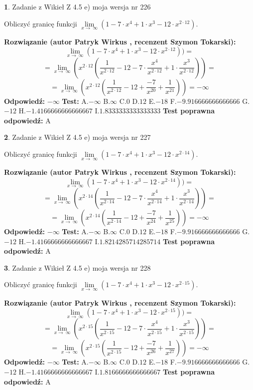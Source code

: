 \documentclass[12pt, a4paper]{article}
\theoremstyle{definition} %
\newtheorem{zad}{}
\newcommand{\zadStart}[1]{\begin{zad}#1\newline}
\newcommand{\zadStop}{\end{zad}}
\newcommand{\rozwStart}[2]{\noindent \textbf{Rozwiązanie (autor #1 , recenzent #2): }\newline}
\newcommand{\rozwStop}{\newline}
\newcommand{\odpStart}{\noindent \textbf{Odpowiedź:}\newline}
\newcommand{\odpStop}{\newline}
\newcommand{\testStart}{\noindent \textbf{Test:}\newline}
\newcommand{\testStop}{\newline}
\newcommand{\kluczStart}{\noindent \textbf{Test poprawna odpowiedź:}\newline}
\newcommand{\kluczStop}{\newline}
\begin{document}
\zadStart{Zadanie z Wikieł Z 4.5 e) moja wersja nr 226}


Obliczyć granicę funkcji  $\lim\limits_{x\to\ \infty}(1 - 7 \cdot x^{4}+1 \cdot x^{3}- 12 \cdot x^{2\cdot12})$.
\zadStop
\rozwStart{Patryk Wirkus}{Szymon Tokarski}
$$\lim\limits_{x\to\ \infty}(1 - 7 \cdot x^{4}+1 \cdot x^{3}- 12 \cdot x^{2\cdot12}))=$$
$$=\lim\limits_{x\to\ \infty}(x^{2\cdot12}(\frac{1}{x^{2\cdot12}}-12 -7 \cdot \frac{x^{4}}{x^{2\cdot12}}+1 \cdot \frac{x^{3}}{x^{2\cdot12}}))=$$
$$=\lim\limits_{x\to\ \infty}(x^{2\cdot12}(\frac{1}{x^{2\cdot12}}-12 + \frac{-7}{x^{20}}+ \frac{1}{x^{21}}))=-\infty$$
\rozwStop
\odpStart
$-\infty$
\odpStop
\testStart
A.$-\infty$ B.$\infty$ C.$0$ D.$12$ E.$-18$
F.$-9.916666666666666$ G.$-12$
H.$-1.4166666666666667$
I.$1.8333333333333333$
\testStop
\kluczStart
A
\kluczStop



\zadStart{Zadanie z Wikieł Z 4.5 e) moja wersja nr 227}


Obliczyć granicę funkcji  $\lim\limits_{x\to\ \infty}(1 - 7 \cdot x^{4}+1 \cdot x^{3}- 12 \cdot x^{2\cdot14})$.
\zadStop
\rozwStart{Patryk Wirkus}{Szymon Tokarski}
$$\lim\limits_{x\to\ \infty}(1 - 7 \cdot x^{4}+1 \cdot x^{3}- 12 \cdot x^{2\cdot14}))=$$
$$=\lim\limits_{x\to\ \infty}(x^{2\cdot14}(\frac{1}{x^{2\cdot14}}-12 -7 \cdot \frac{x^{4}}{x^{2\cdot14}}+1 \cdot \frac{x^{3}}{x^{2\cdot14}}))=$$
$$=\lim\limits_{x\to\ \infty}(x^{2\cdot14}(\frac{1}{x^{2\cdot14}}-12 + \frac{-7}{x^{24}}+ \frac{1}{x^{25}}))=-\infty$$
\rozwStop
\odpStart
$-\infty$
\odpStop
\testStart
A.$-\infty$ B.$\infty$ C.$0$ D.$12$ E.$-18$
F.$-9.916666666666666$ G.$-12$
H.$-1.4166666666666667$
I.$1.8214285714285714$
\testStop
\kluczStart
A
\kluczStop



\zadStart{Zadanie z Wikieł Z 4.5 e) moja wersja nr 228}


Obliczyć granicę funkcji  $\lim\limits_{x\to\ \infty}(1 - 7 \cdot x^{4}+1 \cdot x^{3}- 12 \cdot x^{2\cdot15})$.
\zadStop
\rozwStart{Patryk Wirkus}{Szymon Tokarski}
$$\lim\limits_{x\to\ \infty}(1 - 7 \cdot x^{4}+1 \cdot x^{3}- 12 \cdot x^{2\cdot15}))=$$
$$=\lim\limits_{x\to\ \infty}(x^{2\cdot15}(\frac{1}{x^{2\cdot15}}-12 -7 \cdot \frac{x^{4}}{x^{2\cdot15}}+1 \cdot \frac{x^{3}}{x^{2\cdot15}}))=$$
$$=\lim\limits_{x\to\ \infty}(x^{2\cdot15}(\frac{1}{x^{2\cdot15}}-12 + \frac{-7}{x^{26}}+ \frac{1}{x^{27}}))=-\infty$$
\rozwStop
\odpStart
$-\infty$
\odpStop
\testStart
A.$-\infty$ B.$\infty$ C.$0$ D.$12$ E.$-18$
F.$-9.916666666666666$ G.$-12$
H.$-1.4166666666666667$
I.$1.8166666666666667$
\testStop
\kluczStart
A
\kluczStop
\end{document}

